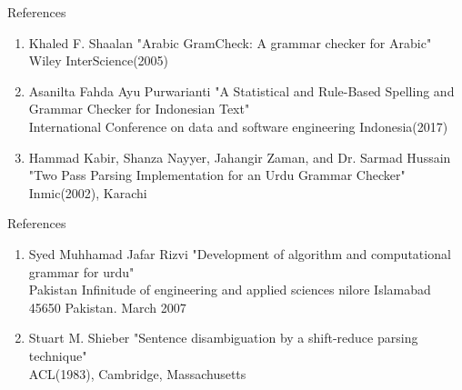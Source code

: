 \documentclass{beamer}
\begin{document}
\begin{frame}{References}
\begin{enumerate}
\item \color{blue}Khaled F. Shaalan
	\color{black} {"Arabic GramCheck:	A grammar checker for Arabic"} \\
	\color{blue} Wiley InterScience(2005)
	\vspace{2em}
	
\item \color{blue} Asanilta Fahda Ayu Purwarianti 
	\color{black} {"A Statistical and Rule-Based Spelling and Grammar Checker for Indonesian Text"}\\
	\color{blue} International Conference on data and software engineering Indonesia(2017)
	\vspace{2em}
	
\item \color{blue} Hammad Kabir, Shanza Nayyer, Jahangir Zaman, and Dr. Sarmad Hussain
\color{black} {"Two Pass Parsing Implementation for an Urdu Grammar Checker"} \\
\color{blue} Inmic(2002), Karachi
\vspace{2em}
\seti 
\end{enumerate}
\end{frame}


\begin{frame}{References}
	
	\begin{enumerate}
	\conti
	\item \color{blue} Syed Muhhamad Jafar Rizvi
	\color{black} {"Development of algorithm and computational grammar for urdu"} \\
	\color{blue} Pakistan Infinitude of engineering and applied sciences
	nilore Islamabad 45650 Pakistan.
	March 2007
	\vspace{2em}
	\item \color{blue} Stuart M. Shieber
	\color{black} {"Sentence disambiguation by a shift-reduce parsing technique"} \\
	\color{blue} ACL(1983), Cambridge, Massachusetts
	
\end{enumerate}
\end{frame}
\end{document}
